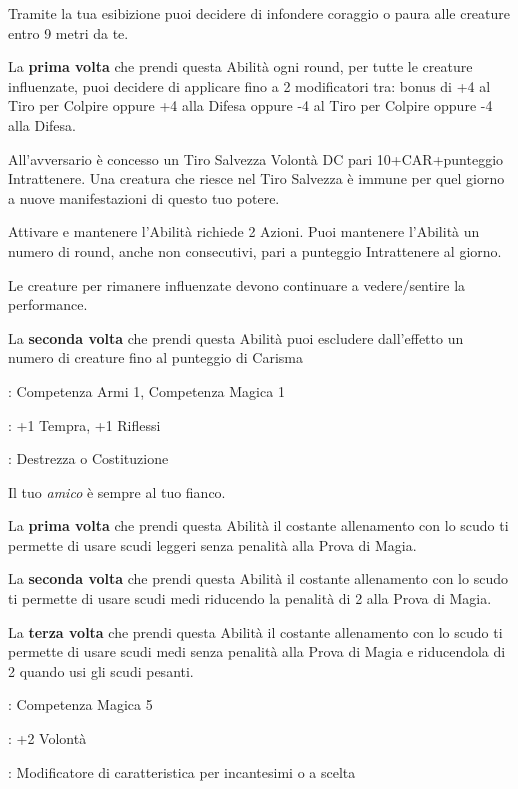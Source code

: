 \begin{multicols}{2}
Tramite la tua esibizione puoi decidere di infondere coraggio o paura alle creature entro 9 metri da te.

La \textbf{prima volta} che prendi questa Abilità ogni round, per tutte le creature influenzate, puoi decidere di applicare fino a 2 modificatori tra: bonus di +4 al Tiro per Colpire oppure +4 alla Difesa oppure -4 al Tiro per Colpire oppure -4 alla Difesa.

All'avversario è concesso un Tiro Salvezza Volontà DC pari 10+CAR+punteggio Intrattenere. Una creatura che riesce nel Tiro Salvezza è immune per quel giorno a nuove manifestazioni di questo tuo potere.

Attivare e mantenere l'Abilità richiede 2 Azioni. Puoi mantenere l'Abilità un numero di round, anche non consecutivi, pari a punteggio Intrattenere al giorno.

Le creature per rimanere influenzate devono continuare a vedere/sentire la performance.

La \textbf{seconda volta} che prendi questa Abilità puoi escludere dall'effetto un numero di creature fino al punteggio di Carisma

\begin{description}[noitemsep, topsep=0pt, parsep=0pt, partopsep=0pt, leftmargin=0cm, labelwidth=2.5cm]
    \item[\textbf{Requisito}]: Competenza Armi 1, Competenza Magica 1
    \item[\textbf{Tiri Salvezza}]: +1 Tempra, +1 Riflessi
    \item[\textbf{Caratteristica}]: Destrezza o Costituzione
\end{description}

Il tuo \emph{amico} è sempre al tuo fianco.

La \textbf{prima volta} che prendi questa Abilità il costante allenamento con lo scudo ti permette di usare scudi leggeri senza penalità alla Prova di Magia.

La \textbf{seconda volta} che prendi questa Abilità il costante allenamento con lo scudo ti permette di usare scudi medi riducendo la penalità di 2 alla Prova di Magia.

La \textbf{terza volta} che prendi questa Abilità il costante allenamento con lo scudo ti permette di usare scudi medi senza penalità alla Prova di Magia e riducendola di 2 quando usi gli scudi pesanti.

\begin{description}[noitemsep, topsep=0pt, parsep=0pt, partopsep=0pt, leftmargin=0cm, labelwidth=2.5cm]
    \item[\textbf{Requisito}]: Competenza Magica 5
    \item[\textbf{Tiri Salvezza}]: +2 Volontà
    \item[\textbf{Caratteristica}]: Modificatore di caratteristica per incantesimi o a scelta
\end{description}


\end{multicols}
